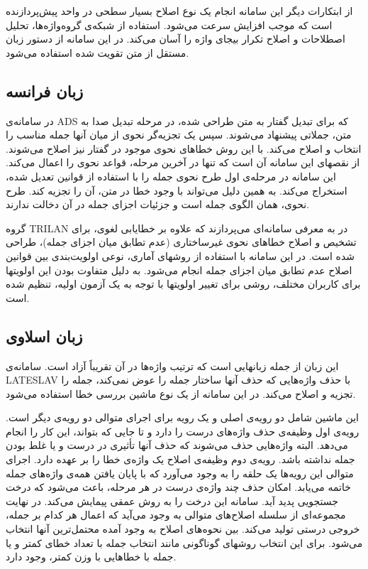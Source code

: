 \documentclass{report}
\begin{document}
از ابتکارات دیگر این سامانه انجام یک نوع اصلاح بسیار سطحی در واحد پیش‌پردازنده است که موجب افزایش سرعت می‌شود. استفاده از شبکه‌ی گروه‌واژه‌ها، تحلیل اصطلاحات و اصلاح تکرار بیجای واژه را آسان می‌کند. در این سامانه از دستور زبان مستقل از متن تقویت شده استفاده می‌شود. 

\subsection{زبان فرانسه}
در سامانه‌ی ADS \cite{ct7} که برای تبدیل گفتار به متن طراحی شده، در مرحله تبدیل صدا به متن، جملاتی پیشنهاد می‌شوند. سپس یک تجزیه‌گر نحوی از میان آنها جمله مناسب را انتخاب و اصلاح می‌کند. با این روش خطاهای نحوی موجود در گفتار نیز اصلاح می‌شوند. از نقصهای این سامانه آن است که تنها در آخرین مرحله، قواعد نحوی را اعمال می‌کند. این سامانه در مرحله‌ی اول طرح نحوی  جمله را با استفاده از قوانین تعدیل شده، استخراج می‌کند. به همین دلیل می‌تواند با وجود خطا در متن، آن را تجزیه  کند. طرح نحوی، همان الگوی جمله است و جزئیات اجزای جمله در آن دخالت ندارند.

گروه TRILAN در \cite{ct20} به معرفی سامانه‌ای می‌پردازند که علاوه بر خطایابی لغوی، برای تشخیص و اصلاح خطاهای نحوی غیرساختاری (عدم تطابق میان اجزای جمله)، طراحی شده است. در این سامانه با استفاده از روشهای آماری، نوعی اولویت‌بندی بین قوانین اصلاح عدم تطابق میان اجزای جمله انجام می‌شود. به دلیل متفاوت بودن این اولویتها برای کاربران مختلف، روشی برای تغییر اولویتها با توجه به یک آزمون اولیه، تنظیم شده است.

\subsection{زبان اسلاوی}
این زبان از جمله زبانهایی است که ترتیب واژه‌ها در آن تقریباً آزاد است. سامانه‌ی LATESLAV \cite{ct21} با حذف واژه‌هایی که حذف آنها ساختار جمله را عوض نمی‌کند، جمله را تجزیه و اصلاح می‌کند. در این سامانه از یک نوع ماشین بررسی خطا استفاده می‌شود.

این ماشین شامل دو رویه‌ی اصلی و یک رویه برای اجرای متوالی دو رویه‌ی دیگر است. رویه‌ی اول وظیفه‌ی حذف واژه‌های درست را دارد و تا جایی که بتواند، این کار را انجام می‌دهد. البته واژه‌هایی حذف می‌شوند که حذف آنها تأثیری در درست و یا غلط بودن جمله نداشته باشد. رویه‌ی دوم وظیفه‌ی اصلاح یک واژه‌ی خطا را بر عهده دارد. اجرای متوالی این رویه‌ها یک حلقه را به وجود می‌آورد که با پایان یافتن همه‌ی واژه‌های جمله خاتمه می‌یابد. امکان حذف چند واژه‌ی درست در هر مرحله، باعث می‌شود که درخت جستجویی پدید آید. سامانه این درخت را به روش عمقی پیمایش می‌کند. در نهایت مجموعه‌ای از سلسله اصلاح‌های متوالی به وجود می‌آید که اعمال هر کدام بر جمله، خروجی درستی تولید می‌کند. بین نحوه‌های اصلاح به وجود آمده محتمل‌ترین آنها انتخاب می‌شود. برای این انتخاب روشهای گوناگونی مانند انتخاب جمله با تعداد خطای کمتر و یا جمله با خطاهایی با وزن کمتر، وجود دارد.
\end{document}
